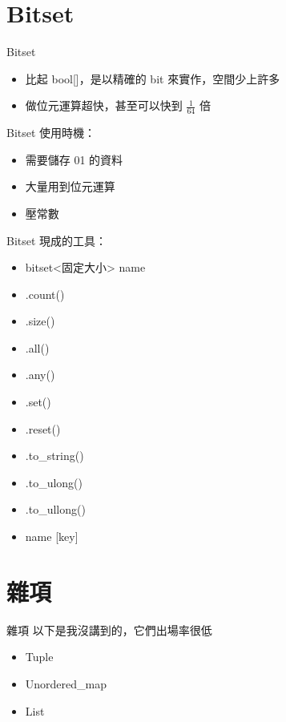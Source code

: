 \documentclass[mathserif]{beamer}
\begin{document}
\section{Bitset}

\begin{frame}{Bitset}
    \begin{itemize}
        \item 比起 bool[]，是以精確的 bit 來實作，空間少上許多
        \item 做位元運算超快，甚至可以快到 $\frac{1}{64}$ 倍
    \end{itemize}
\end{frame}

\begin{frame}{Bitset}
    使用時機：
    \begin{itemize}
        \item 需要儲存 01 的資料
        \item 大量用到位元運算
        \item 壓常數
    \end{itemize}
\end{frame}

\begin{frame}{Bitset}
    現成的工具：
    \begin{itemize}
        \item bitset<{\color{red}固定大小}> {\color{red}name}
        \item .count()
        \item .size()
        \item .all()
        \item .any()
        \item .set()
        \item .reset()
        \item .to\_string()
        \item .to\_ulong()
        \item .to\_ullong()
        \item {\color{red}name} [{\color{red}key}]
    \end{itemize}
\end{frame}

\section{雜項}

\begin{frame}{雜項}
    以下是我沒講到的，它們出場率很低
    \begin{itemize}
        \item Tuple
        \item Unordered\_map
        \item List
    \end{itemize}
\end{frame}
\end{document}
